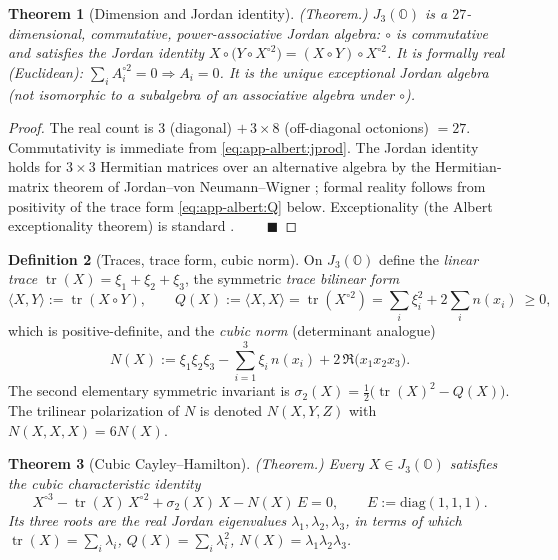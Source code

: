 \documentclass[11pt]{article}
\theoremstyle{plain}
\newtheorem{theorem}{Theorem}[section]
\theoremstyle{definition}
\newtheorem{definition}[theorem]{Definition}
\theoremstyle{remark}
\begin{document}
\begin{theorem}[Dimension and Jordan identity]\label{thm:app-albert:dim}
\textup{(Theorem.)}
$J_3(\mathbb O)$ is a $27$-dimensional, commutative, power-associative Jordan
algebra: $\circ$ is commutative and satisfies the Jordan identity
$X\circ\bigl(Y\circ X^{\circ 2}\bigr)=(X\circ Y)\circ X^{\circ 2}$. It is
\emph{formally real} (Euclidean): $\sum_i A_i^{\circ2}=0\Rightarrow A_i=0$. It is
the unique exceptional Jordan algebra (not isomorphic to a subalgebra of an
associative algebra under $\circ$).
\end{theorem}

\begin{proof}
The real count is $3$ (diagonal) $+\,3\times 8$ (off-diagonal octonions)
$=27$. Commutativity is immediate from \eqref{eq:app-albert:jprod}. The Jordan
identity holds for $3\times3$ Hermitian matrices over an alternative algebra by
the Hermitian-matrix theorem of Jordan--von Neumann--Wigner
\cite{JNW:1934,McCrimmon:2004}; formal reality follows from positivity of the
trace form \eqref{eq:app-albert:Q} below. Exceptionality (the Albert
exceptionality theorem) is standard \cite{Albert:1934,Schafer:1966}.
$\qquad\blacksquare$
\end{proof}

\begin{definition}[Traces, trace form, cubic norm]\label{def:app-albert:invariants}
On $J_3(\mathbb O)$ define the \emph{linear trace}
$\operatorname{tr}(X)=\xi_1+\xi_2+\xi_3$, the symmetric \emph{trace bilinear form}
\begin{equation}\label{eq:app-albert:Q}
  \langle X,Y\rangle:=\operatorname{tr}(X\circ Y),
  \qquad
  Q(X):=\langle X,X\rangle=\operatorname{tr}(X^{\circ2})
  =\sum_i\xi_i^2+2\sum_i n(x_i)\ \ge 0,
\end{equation}
which is positive-definite, and the \emph{cubic norm} (determinant analogue)
\begin{equation}\label{eq:app-albert:N}
  N(X):=\xi_1\xi_2\xi_3-\sum_{i=1}^{3}\xi_i\,n(x_i)+2\,\Re\!\bigl(x_1 x_2 x_3\bigr).
\end{equation}
The second elementary symmetric invariant is
$\sigma_2(X)=\tfrac12\bigl(\operatorname{tr}(X)^2-Q(X)\bigr)$. The trilinear
polarization of $N$ is denoted $N(X,Y,Z)$ with $N(X,X,X)=6N(X)$.
\end{definition}

\begin{theorem}[Cubic Cayley--Hamilton]\label{thm:app-albert:CH}
\textup{(Theorem.)}
Every $X\in J_3(\mathbb O)$ satisfies the cubic characteristic identity
\begin{equation}\label{eq:app-albert:CH}
  X^{\circ3}-\operatorname{tr}(X)\,X^{\circ2}+\sigma_2(X)\,X-N(X)\,E=0,
  \qquad E:=\mathrm{diag}(1,1,1).
\end{equation}
Its three roots are the real \emph{Jordan eigenvalues}
$\lambda_1,\lambda_2,\lambda_3$, in terms of which
$\operatorname{tr}(X)=\sum_i\lambda_i$, $Q(X)=\sum_i\lambda_i^2$,
$N(X)=\lambda_1\lambda_2\lambda_3$.
\end{theorem}
\end{document}
